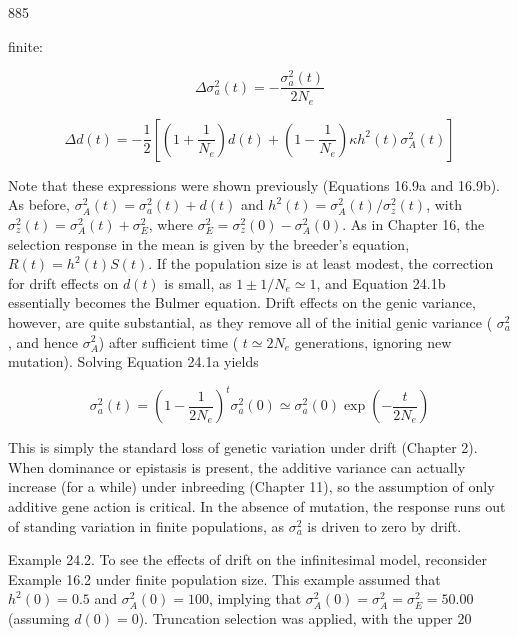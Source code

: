 \documentclass{article}
\begin{document}
885

finite:

\begin{equation}
\Delta\sigma_{a}^{2}(t)=-\frac{\sigma_{a}^{2}(t)}{2N_{e}}
\tag{24.1a}
\label{eq:24_1a}
\end{equation}

\begin{equation}
\Delta d(t)=-\frac{1}{2}\left[\left(1+\frac{1}{N_{e}}\right)d(t)+\left(1-\frac{1}{N_{e}}\right)\kappa h^{2}(t)\sigma_{A}^{2}(t)\right]
\tag{24.1b}
\label{eq:24_1b}
\end{equation}

Note that these expressions were shown previously (Equations 16.9a and 16.9b). As before,  $ \sigma_A^2(t) = \sigma_a^2(t) + d(t) $ and  $ h^2(t) = \sigma_A^2(t)/\sigma_z^2(t) $, with  $ \sigma_z^2(t) = \sigma_A^2(t) + \sigma_E^2 $, where  $ \sigma_E^2 = \sigma_z^2(0) - \sigma_A^2(0) $. As in Chapter 16, the selection response in the mean is given by the breeder's equation,  $ R(t) = h^2(t)S(t) $. If the population size is at least modest, the correction for drift effects on  $ d(t) $ is small, as  $ 1 \pm 1/N_e \simeq 1 $, and Equation 24.1b essentially becomes the Bulmer equation. Drift effects on the genic variance, however, are quite substantial, as they remove all of the initial genic variance ( $ \sigma_a^2 $, and hence  $ \sigma_A^2 $) after sufficient time ( $ t \simeq 2N_e $ generations, ignoring new mutation). Solving Equation 24.1a yields

\begin{equation}
\sigma_{a}^{2}(t)=\left(1-\frac{1}{2N_{e}}\right)^{t}\sigma_{a}^{2}(0)\simeq\sigma_{a}^{2}(0)\exp\left(-\frac{t}{2N_{e}}\right)
\tag{24.1c}
\label{eq:24_1c}
\end{equation}

This is simply the standard loss of genetic variation under drift (Chapter 2). When dominance or epistasis is present, the additive variance can actually increase (for a while) under inbreeding (Chapter 11), so the assumption of only additive gene action is critical. In the absence of mutation, the response runs out of standing variation in finite populations, as  $ \sigma_{a}^{2} $ is driven to zero by drift.

Example 24.2. To see the effects of drift on the infinitesimal model, reconsider Example 16.2 under finite population size. This example assumed that  $ h^2(0) = 0.5 $ and  $ \sigma_A^2(0) = 100 $, implying that  $ \sigma_A^2(0) = \sigma_A^2 = \sigma_E^2 = 50.00 $ (assuming  $ d(0) = 0 $). Truncation selection was applied, with the upper 20%
\end{document}
